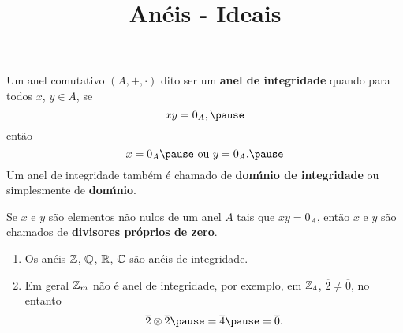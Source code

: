 \documentclass{beamer}
\title{An\'eis - Ideais}
\author[\autor]{\autor}
\institute[\instituto]{\instituto}
\date{}
\begin{document}
    \begin{frame}
        \maketitle
    \end{frame}

    \begin{frame}
        \begin{definicao}
            Um anel comutativo $(A, + , \cdot)$  dito ser um \textbf{anel de integridade} \pause quando para todos $x$, $y \in A$, \pause se
            \[
                xy = 0_A,\pause
            \]
            ent{\~a}o
            \[
                x = 0_A\pause \mbox{ ou } y = 0_A.\pause
            \]
            Um anel de integridade tamb{\'e}m {\'e} chamado de \textbf{dom{\'\i}nio de integridade} \pause ou simplesmente de \textbf{dom{\'\i}nio}.\pause
        \end{definicao}

        \begin{observacao}
            Se $x$ e $y$ s{\~a}o elementos n{\~a}o nulos \pause de um anel $A$ \pause tais que $xy = 0_A$, \pause ent{\~a}o $x$ e $y$ s{\~a}o chamados de \pause \textbf{divisores pr{\'o}prios de zero}.\pause
        \end{observacao}
    \end{frame}

    \begin{frame}
        \begin{exemplos}
            \begin{enumerate}[label={\arabic*})]
                \item Os an{\'e}is $\mathbb{Z}$, \pause $\mathbb{Q}$, \pause $\mathbb{R}$, \pause $\mathbb{C}$ \pause s{\~a}o an{\'e}is de integridade.\pause

                \vspace{.5cm}

                \item Em geral $\mathbb{Z}_m$ \pause n{\~a}o {\'e} anel de integridade, \pause por exemplo, em $\mathbb{Z}_4$, \pause $\overline{2} \neq \overline{0}$, \pause no entanto
                \[
                    \overline{2}\otimes \overline{2} \pause = \overline{4} \pause = \overline{0}.
                \]
                \vspace{.5cm}

                \seti
            \end{enumerate}
        \end{exemplos}
    \end{frame}
\end{document}
